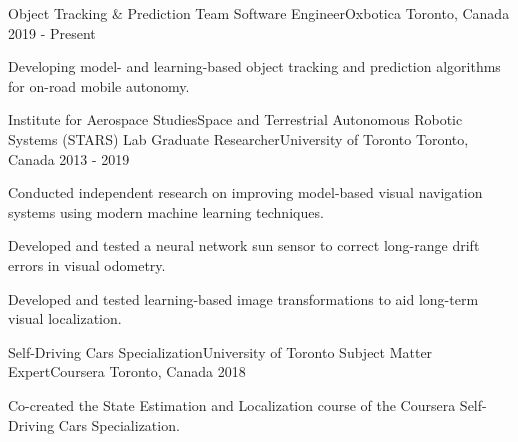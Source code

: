

\begin{cventries}

  \cventry
    {Object Tracking \& Prediction Team} %
    {Software Engineer{\enskip\cdotp\enskip}Oxbotica} %
    {Toronto, Canada} %
    {2019 - Present} %
    {
      \begin{cvitems} %
        \item {Developing model- and learning-based object tracking and prediction algorithms for on-road mobile autonomy.}
      \end{cvitems}
    }
  
  \cventry
    {Institute for Aerospace Studies{\enskip\cdotp\enskip}Space and Terrestrial Autonomous Robotic Systems (STARS) Lab} %
    {Graduate Researcher{\enskip\cdotp\enskip}University of Toronto} %
    {Toronto, Canada} %
    {2013 - 2019} %
    {
      \begin{cvitems} %
        \item {Conducted independent research on improving model-based visual navigation systems using modern machine learning techniques.}
        \item {Developed and tested a neural network sun sensor to correct long-range drift errors in visual odometry.}
        \item {Developed and tested learning-based image transformations to aid long-term visual localization.}
      \end{cvitems}
    }
    
  \cventry
    {Self-Driving Cars Specialization{\enskip\cdotp\enskip}University of Toronto} %
    {Subject Matter Expert{\enskip\cdotp\enskip}Coursera} %
    {Toronto, Canada} %
    {2018} %
    {
      \begin{cvitems} %
        \item {Co-created the State Estimation and Localization course of the Coursera Self-Driving Cars Specialization.}
      \end{cvitems}
    }
    

\end{cventries}
